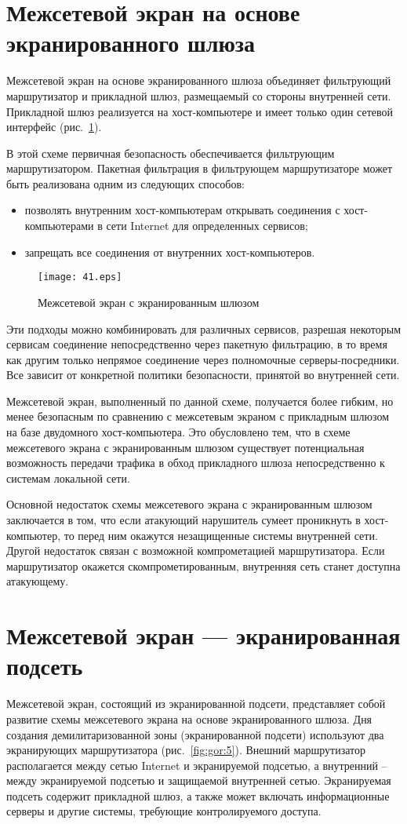 \section{Межсетевой экран на основе экранированного шлюза}
Межсетевой экран на основе экранированного шлюза объединяет
фильтрующий маршрутизатор и прикладной шлюз, размещаемый со стороны
внутренней сети. Прикладной шлюз реализуется на хост-компьютере и
имеет только один сетевой интерфейс (рис.~\ref{fig:gor:4}).

В этой схеме первичная безопасность обеспечивается фильтрующим
маршрутизатором. Пакетная фильтрация в фильтрующем маршрутизаторе
может быть реализована одним из следующих способов:
\begin{itemize}
\item позволять внутренним хост-компьютерам открывать
    соединения с хост-компьютерами в сети Internet для определенных
    сервисов;
\item  запрещать все соединения от внутренних хост-компьютеров.
\end{itemize}


\begin{figure}[!htp]
\centerline{\texttt{[image: 41.eps]}}
\caption{Межсетевой экран с экранированным шлюзом}
\label{fig:gor:4}
\end{figure}
Эти подходы можно комбинировать для различных сервисов, разрешая
некоторым сервисам соединение непосредственно через пакетную
фильтрацию, в то время как другим только непрямое соединение через
полномочные серверы-посредники. Все зависит от конкретной политики
безопасности, принятой во внутренней сети.

Межсетевой экран, выполненный по данной схеме, получается более
гибким, но менее безопасным по сравнению с межсетевым экраном с
прикладным шлюзом на базе двудомного хост-компьютера. Это обусловлено
тем, что в схеме межсетевого экрана с экранированным шлюзом существует
потенциальная возможность передачи трафика в обход прикладного шлюза
непосредственно к системам локальной сети.

Основной недостаток схемы межсетевого экрана с экранированным шлюзом
заключается в том, что если атакующий нарушитель сумеет проникнуть в
хост-компьютер, то перед ним окажутся незащищенные системы внутренней
сети. Другой недостаток связан с возможной компрометацией
маршрутизатора. Если маршрутизатор окажется скомпрометированным,
внутренняя сеть станет доступна атакующему.

\section{Межсетевой экран --- экранированная подсеть}
Межсетевой экран, состоящий из экранированной подсети, представляет
собой развитие схемы межсетевого экрана на основе экранированного
шлюза. Дня создания демилитаризованной зоны (экранированной подсети)
используют два экранирующих маршрутизатора (рис.~\ref{fig:gor:5}). Внешний
маршрутизатор располагается между сетью Internet и экранируемой
подсетью, а внутренний – между экранируемой подсетью и защищаемой
внутренней сетью. Экранируемая подсеть содержит прикладной шлюз, а
также может включать информационные серверы и другие системы,
требующие контролируемого доступа.

